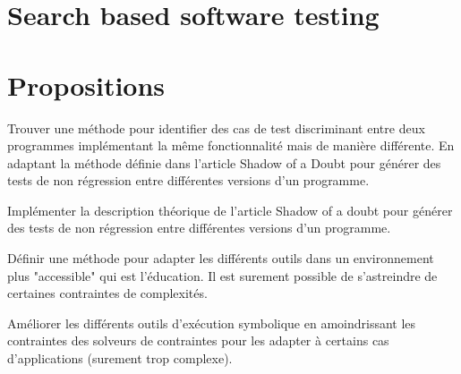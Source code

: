 \section{Search based software testing}


\section{Propositions}

Trouver une méthode pour identifier des cas de test discriminant entre deux programmes implémentant la même fonctionnalité mais de manière différente. En adaptant la méthode définie dans l'article Shadow of a Doubt\cite{shadow} pour générer des tests de non régression entre différentes versions d'un programme.

Implémenter la description théorique de l'article Shadow of a doubt\cite{shadow} pour générer des tests de non régression entre différentes versions d'un programme.

Définir une méthode pour adapter les différents outils dans un environnement plus "accessible" qui est l'éducation. Il est surement possible de s'astreindre de certaines contraintes de complexités.

Améliorer les différents outils d'exécution symbolique en amoindrissant les contraintes des solveurs de contraintes pour les adapter à certains cas d'applications (surement trop complexe).